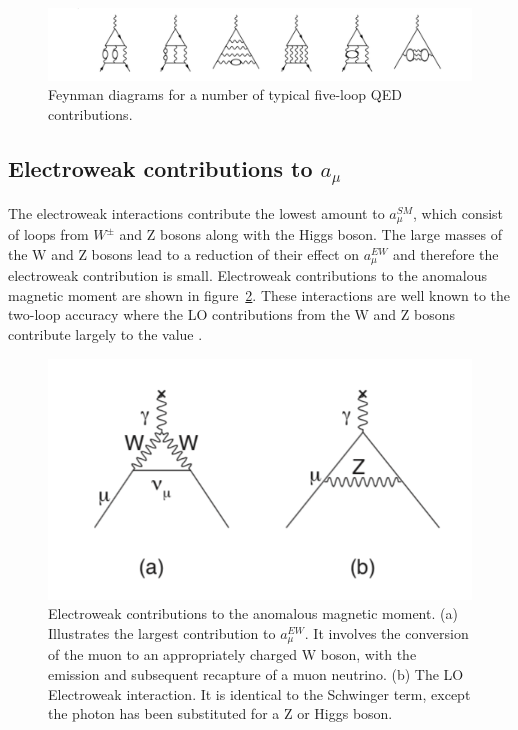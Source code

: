 \begin{figure}[th]
\centering
\includegraphics[scale=0.6]{Figures/QED5loop}
\decoRule
\caption{Feynman diagrams for a number of typical five-loop QED  contributions.}
\label{fig:QED5loop}
\end{figure}

\subsection{Electroweak contributions to $a_{\mu}$}

The electroweak interactions contribute the lowest amount to $a_{\mu}^{SM}$, which consist of loops from $W^{\pm}$ and Z bosons along with the Higgs boson. The large masses of the W and Z bosons lead to a reduction of their effect on $a_{\mu}^{EW}$ and therefore the electroweak contribution is small. Electroweak contributions to the anomalous magnetic moment are shown in figure~\ref{fig:weakContribution}. These interactions are well known to the two-loop accuracy where the LO contributions from the W and Z bosons contribute largely to the value \cite{Reference18,Reference19}.

\begin{figure}[th]
\centering
\includegraphics[scale=0.7]{Figures/weakContribution}
\decoRule
\caption{Electroweak contributions to the anomalous magnetic moment. (a) Illustrates the largest contribution to $a_{\mu}^{EW}$. It involves the conversion of the muon to an appropriately charged W boson, with the emission and subsequent recapture of a muon neutrino. (b) The LO Electroweak interaction. It is identical to the Schwinger term, except the photon has been substituted for a Z or Higgs boson.}
\label{fig:weakContribution}
\end{figure}

